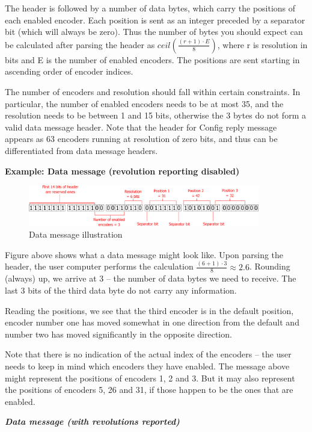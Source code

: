 \documentclass[twoside]{article}
\begin{document}
The header is followed by a number of data bytes, which carry the positions of each enabled encoder. Each position is sent as an integer preceded by a separator bit (which will always be zero). Thus the number of bytes you should expect can be calculated after parsing the header as $ceil(\frac{(r+1)\cdot{}E}{8})$, where r is resolution in bits and E is the number of enabled encoders. The positions are sent starting in ascending order of encoder indices.

The number of encoders and resolution should fall within certain constraints. In particular, the number of enabled encoders needs to be at most 35, and the resolution needs to be between 1 and 15 bits, otherwise the 3 bytes do not form a valid data message header. Note that the header for Config reply message appears as 63 encoders running at resolution of zero bits, and thus can be differentiated from data message headers.


\textbf{Example: Data message (revolution reporting disabled)}
\begin{figure}[h]
	\centering
	\includegraphics[width=0.9\textwidth]{figs/reply2}
	\caption{Data message illustration}

\end{figure}

Figure above shows what a data message might look like. Upon parsing the header, the user computer performs the calculation $\frac{(6+1)\cdot{}3}{8} \approx 2.6$. Rounding (always) up, we arrive at 3 -- the number of data bytes we need to receive. The last 3 bits of the third data byte do not carry any information.

Reading the positions, we see that the third encoder is in the default position, encoder number one has moved somewhat in one direction from the default and number two has moved significantly in the opposite direction.

Note that there is no indication of the actual index of the encoders -- the user needs to keep in mind which encoders they have enabled. The message above might represent the positions of encoders 1, 2 and 3. But it may also represent the positions of encoders 5, 26 and 31, if those happen to be the ones that are enabled.

\noindent{}\emph{\textbf{Data message (with revolutions reported)}}
\end{document}
